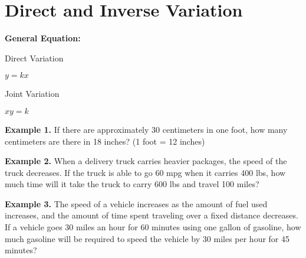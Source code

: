 \section[Variation]{Direct and Inverse Variation}

\bigskip
\textbf{General Equation:} 

\begin{center}
\setlength{\columnseprule}{0pt}
\begin{multicols}{2}
Direct Variation

$y=kx$

\columnbreak
Joint Variation

$xy=k$
\end{multicols}
\end{center}

\vfill
\textbf{Example 1.} If there are approximately 30 centimeters in one foot, how many centimeters are there in 18 inches? (1 foot = 12 inches)

\vfill
\textbf{Example 2.}  When a delivery truck carries heavier packages, the speed of the truck decreases. If the truck is able to go 60 mpg when it carries 400 lbs, how much time will it take the truck to carry 600 lbs and travel 100 miles?

\vfill
\textbf{Example 3.} The speed of a vehicle increases as the amount of fuel used increases, and the amount of time spent traveling over a fixed distance decreases. If a vehicle goes 30 miles an hour for 60 minutes using one gallon of gasoline, how much gasoline will be required to speed the vehicle by 30 miles per hour for 45 minutes?

